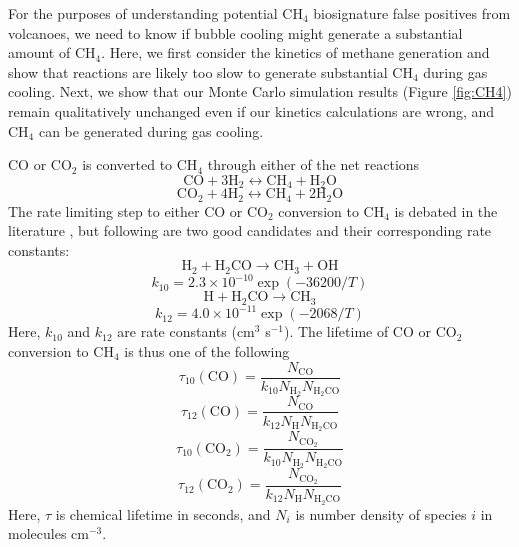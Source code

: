 For the purposes of understanding potential CH$_4$ biosignature false positives from volcanoes, we need to know if bubble cooling might generate a substantial amount of CH$_4$. Here, we first consider the kinetics of methane generation and show that reactions are likely too slow to generate substantial CH$_4$ during gas cooling. Next, we show that our Monte Carlo simulation results (Figure \ref{fig:CH4}) remain qualitatively unchanged even if our kinetics calculations are wrong, and CH$_4$ can be generated during gas cooling.

CO or CO$_2$ is converted to CH$_4$ through either of the net reactions \citep{Schaefer_2010}
\begin{equation}
    \mathrm{CO}+3\mathrm{H_2} \leftrightarrow \mathrm{CH_4} + \mathrm{H_2O}
\end{equation}
\begin{equation}
    \mathrm{CO_2}+4\mathrm{H_2} \leftrightarrow \mathrm{CH_4} + \mathrm{2H_2O}
\end{equation}
The rate limiting step to either CO or CO$_2$ conversion to CH$_4$ is debated in the literature \citep{Zahnle_2014}, but following are two good candidates and their corresponding rate constants:
\begin{equation}
    \mathrm{H_2}+\mathrm{H_2CO} \rightarrow \mathrm{CH_3} + \mathrm{OH}
\end{equation}
\begin{equation}
    k_{10} = 2.3\times10^{-10}\exp(-36200/T)
\end{equation}
\begin{equation}
    \mathrm{H}+\mathrm{H_2CO} \rightarrow \mathrm{CH_3} 
\end{equation}
\begin{equation}
    k_{12} = 4.0\times10^{-11}\exp(-2068/T)
\end{equation}
Here, $k_{10}$ and $k_{12}$ are rate constants (cm$^3$ s$^{-1}$). The lifetime of CO or CO$_2$ conversion to CH$_4$ is thus one of the following
\begin{equation} \label{eq:first_time}
    \tau_{10}(\mathrm{CO})=\frac{N_\mathrm{CO}}{k_{10}N_\mathrm{H_2}N_\mathrm{H_2CO}}
\end{equation}
\begin{equation}
    \tau_{12}(\mathrm{CO})=\frac{N_\mathrm{CO}}{k_{12}N_\mathrm{H}N_\mathrm{H_2CO}}
\end{equation}
\begin{equation}
    \tau_{10}(\mathrm{CO_2})=\frac{N_\mathrm{CO_2}}{k_{10}N_\mathrm{H_2}N_\mathrm{H_2CO}}
\end{equation}
\begin{equation} \label{eq:last_time}
    \tau_{12}(\mathrm{CO_2})=\frac{N_\mathrm{CO_2}}{k_{12}N_\mathrm{H}N_\mathrm{H_2CO}}
\end{equation}
Here, $\tau$ is chemical lifetime in seconds, and $N_i$ is number density of species $i$ in molecules cm$^{-3}$.


